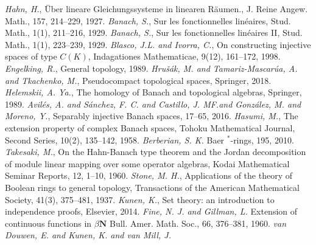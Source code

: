 \documentclass[12pt]{article}
\begin{document}
\begin{thebibliography}{999}
    \textit{Hahn, H.}, {\"U}ber lineare Gleichungssysteme in linearen
    R{\"a}umen., J. Reine Angew. Math., 157, 214--229, 1927.
    \textit{Banach, S.}, Sur les fonctionnelles lin{\'e}aires, Stud. Math.,
    1(1), 211--216, 1929.
    \textit{Banach, S.}, Sur les fonctionnelles lin{\'e}aires II, Stud. Math.,
    1(1), 223--239, 1929.
    \textit{Blasco, J.L. and Ivorra, C.}, On constructing injective spaces of
    type $C(K)$, Indagationes Mathematicae, 9(12), 161--172, 1998.
    \textit{Engelking, R.}, General topology, 1989.
    \textit{Hru{\v{s}}{\'a}k, M. and Tamariz-Mascar{\'u}a, A. and Tkachenko,
    M.}, Pseudocompact topological spaces, Springer, 2018.
    \textit{Helemskii, A. Ya.}, The homology of Banach and topological algebras,
    Springer, 1989.
    \textit{
        Avil{\'e}s, A. and S{\'a}nchez, F. C. and Castillo, J. MF.\@ and
        Gonz{\'a}lez, M. and Moreno, Y.},
    Separably injective Banach spaces, 17--65, 2016.
    \textit{Hasumi, M.}, The extension property of complex Banach spaces, Tohoku
    Mathematical Journal, Second Series, 10(2), 135--142, 1958.
    \textit{Berberian, S. K.}
    Baer $^*$-rings, 195, 2010.
    \textit{Takesaki, M.}, On the Hahn-Banach type theorem and the Jordan
    decomposition of module linear mapping over some operator algebras, Kodai
    Mathematical Seminar Reports, 12, 1--10, 1960.
    \textit{Stone, M. H.}, Applications of the theory of Boolean rings to
    general topology, Transactions of the American Mathematical Society, 41(3),
    375--481, 1937.
    \textit{Kunen, K.}, Set theory: an introduction to independence proofs,
    Elsevier, 2014.
    \textit{Fine, N. J. and Gillman, L.}
    Extension of continuous functions in $\beta {\mathbf{N}}$ Bull. Amer. Math.
    Soc., 66, 376--381, 1960.
    \textit{van Douwen, E. and  Kunen,  K. and van Mill, J.}

\end{thebibliography}
\end{document}
